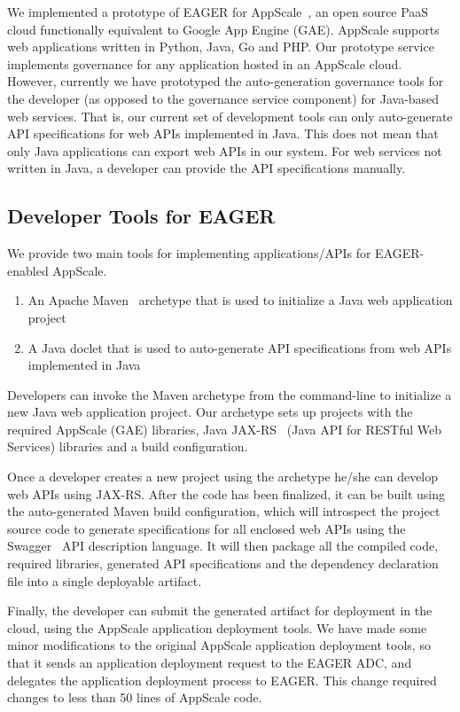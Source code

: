 We implemented a prototype of EAGER for AppScale~\cite{appscale13}, 
an open source PaaS cloud
functionally equivalent to Google App Engine (GAE).  AppScale supports
web applications written in Python, Java, Go and PHP. Our prototype service
implements governance for any application hosted in an AppScale cloud. 
However,
currently we have prototyped the auto-generation governance tools for the
developer (as opposed to the
governance service component) for Java-based web services.
That is, our current set of development tools can only auto-generate API
specifications for web APIs implemented in Java. This does not mean that only
Java applications can export web APIs in our system. For web services not
written in Java, a developer can
provide the API specifications manually.

\subsection{Developer Tools for EAGER}
We provide two main tools for implementing applications/APIs for EAGER-enabled AppScale.
\begin{enumerate}
\item An Apache Maven~\cite{maven} archetype that is used to initialize a Java web application project
\item A Java doclet that is used to auto-generate API specifications from web APIs implemented in Java
\end{enumerate}

Developers can invoke the Maven archetype from the command-line to initialize
a new Java web application project. Our archetype sets up projects with the
required AppScale (GAE) libraries, Java JAX-RS~\cite{jaxrs} (Java API for RESTful Web
Services) libraries and a build configuration.

Once a developer creates a new project using the archetype he/she can develop
web APIs using JAX-RS. After the code has been finalized, it can be built
using the auto-generated Maven build configuration, which will introspect the
project source code to generate specifications for all enclosed web APIs using
the Swagger~\cite{swagger} API description language. 
It will then package all the compiled
code, required libraries, generated API specifications and the dependency
declaration file into a single deployable artifact.

Finally, the developer can submit the generated artifact for deployment in the
cloud, using the AppScale application deployment tools. We have made some
minor modifications to the original AppScale application deployment tools, so
that it sends an application deployment request to the EAGER ADC, and
delegates the application deployment process to EAGER. This change required
changes to less than 50 lines of AppScale code.

